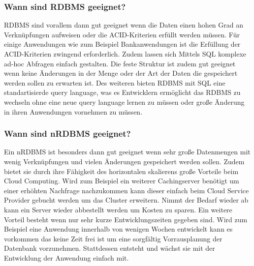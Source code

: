 \documentclass[12pt, a4paper, twoside]{article}
\newcounter{SeitenzahlSpeicher}
\begin{document}
	\subsubsection{Wann sind \ac{RDBMS} geeignet?}
		\ac{RDBMS} sind vorallem dann gut geeignet wenn die Daten einen hohen Grad an Verknüpfungen aufweisen oder die ACID-Kriterien erfüllt werden müssen. Für einige Anwendungen wie zum Beispiel Bankanwendungen ist die Erfüllung der ACID-Kriterien zwingend erforderlich. Zudem lassen sich  Mittels SQL komplexe ad-hoc Abfragen einfach gestalten. Die feste Struktur ist zudem gut geeignet wenn keine Änderungen in der Menge oder der Art der Daten die gespeichert werden sollen zu erwarten ist. Des weiteren bieten \ac{RDBMS} mit SQL eine standartisierde query language, was es Entwicklern ermöglicht das \ac{RDBMS} zu wechseln ohne eine neue query language lernen zu müssen oder große Änderung in ihren Anwendungen vornehmen zu müssen.
		\cite{ibm-sql-nosql}
	\subsubsection{Wann sind \ac{nRDBMS} geeignet?}
		Ein \ac{nRDBMS} ist besonders dann gut geeignet wenn sehr große Datenmengen mit wenig Verknüpfungen und vielen Änderungen gespeichert werden sollen. Zudem bietet sie durch ihre Fähigkeit des horizontalen skalierens große Vorteile beim Cloud Computing. Wird zum Beispiel ein weiterer Cachingserver benötigt um einer erhöhten Nachfrage nachzukommen kann dieser einfach beim Cloud Service Provider gebucht werden um das Cluster erweitern. Nimmt der Bedarf wieder ab kann ein Server wieder abbestellt werden um Kosten zu sparen. Ein weitere Vorteil besteht wenn nur sehr kurze Entwicklungszeiten gegeben sind. Wird zum Beispiel eine Anwendung innerhalb von wenigen Wochen entwickelt kann es vorkommen das keine Zeit frei ist um eine sorgfältig Vorrausplanung der Datenbank vorzunehmen. Stattdessen entsteht und wächst sie mit der Entwicklung der Anwendung einfach mit.
		\cite{ibm-sql-nosql}
\newpage
\clearpage
{}
\setcounter{page}{\theSeitenzahlSpeicher}


\end{document}
